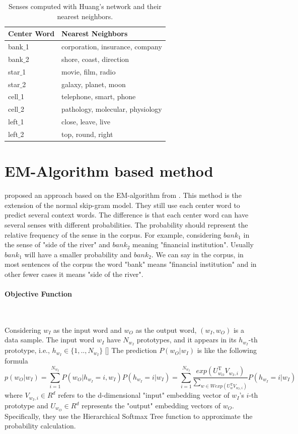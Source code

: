 \begin{table}[tb]
\begin{center}
\caption{Senses computed with Huang's network and their nearest neighbors.} 
\label{tab:huang}
\vspace{2mm}
 \begin{tabular}{|l|l|}
  \hline
  Center Word &Nearest Neighbors \\
  \hline  
  bank$\_$1 & corporation, insurance, company\\
  \hline
  bank$\_$2 & shore, coast, direction\\
  \hline
  star$\_$1 & movie, film, radio\\
  \hline
  star$\_$2 & galaxy, planet, moon\\
  \hline
  cell$\_$1 & telephone, smart, phone\\
  \hline
  cell$\_$2 & pathology, molecular, physiology\\
  \hline
  left$\_$1 & close, leave, live\\
  \hline
  left$\_$2 & top, round, right\\
  \hline
 \end{tabular}
\end{center}
\end{table}

\section{EM-Algorithm based method}


\cite{TianDaiEtAl2014} proposed an approach based on the EM-algorithm from . This method is the extension of the normal skip-gram model. They still use each center word to predict several context words. The difference is that each center word can have several senses with different probabilities. The probability should represent the relative frequency of the sense in the corpus. For example, considering $bank_1$ in the sense of "side of the river" and $bank_2$ meaning "financial institution". Usually $bank_1$ will have a smaller probability and $bank_2$. We can say in the corpus, in most sentences of the corpus the word "bank" means "financial institution" and in other fewer cases it means "side of the river". 

\paragraph{Objective Function}\

Considering $w_I$ as the input word and $w_O$ as the output word, $(w_I,w_O)$ is a data sample. The input word $w_I$ have $N_{w_I}$ prototypes, and it appears in its $h_{w_I}$-th prototype, i.e., $h_{w_I}\in \{1,..,N_{w_I}\}$ [] The prediction $P(w_O|w_I)$ is like the following formula
$$p(w_O|w_I)=\sum^{N_{w_I}}_{i=1}P(w_O|h_{w_I}=i,w_I)P(h_{w_I}=i|w_I)=\sum^{N_{w_I}}_{i=1}\frac{exp(U^{\mathrm{T}}_{w_O}V_{w_I,i})}{\sum_{w\in W exp(U^\mathrm{T}_w V_{w_I,i})}}P(h_{w_I}=i|w_I)$$
where $V_{w_I,i}\in R^d$ refers to the d-dimensional "input" embedding vector of $w_I$'s $i$-th prototype and $U_{w_O}\in R^d$ represents the "output" embedding vectors of $w_O$. Specifically, they use the Hierarchical Softmax Tree function to approximate the probability calculation. 

